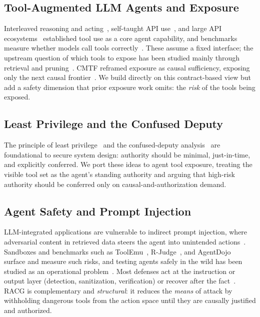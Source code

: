 \documentclass[conference,onecolumn]{IEEEtran}
\begin{document}
\subsection{Tool-Augmented LLM Agents and Exposure}
Interleaved reasoning and acting~\cite{yao2022react}, self-taught API use~\cite{schick2023toolformer}, and large API ecosystems~\cite{qin2023toollm} established tool use as a core agent capability, and benchmarks measure whether models call tools correctly~\cite{li2023apibank,patil2024bfcl,liu2023agentbench}. These assume a fixed interface; the upstream question of which tools to expose has been studied mainly through retrieval and pruning~\cite{shi2025toolret,gan2025ragmcp,liu2025toolscope,repantis2026howmanytools}. CMTF reframed exposure as causal sufficiency, exposing only the next causal frontier~\cite{anon2026cmtf}. We build directly on this contract-based view but add a safety dimension that prior exposure work omits: the \emph{risk} of the tools being exposed.

\subsection{Least Privilege and the Confused Deputy}
The principle of least privilege~\cite{saltzer1975protection} and the confused-deputy analysis~\cite{hardy1988confused} are foundational to secure system design: authority should be minimal, just-in-time, and explicitly conferred. We port these ideas to agent tool exposure, treating the visible tool set as the agent's standing authority and arguing that high-risk authority should be conferred only on causal-and-authorization demand.

\subsection{Agent Safety and Prompt Injection}
LLM-integrated applications are vulnerable to indirect prompt injection, where adversarial content in retrieved data steers the agent into unintended actions~\cite{greshake2023injection}. Sandboxes and benchmarks such as ToolEmu~\cite{ruan2024toolemu}, R-Judge~\cite{tian2023rjudge}, and AgentDojo~\cite{debenedetti2024agentdojo} surface and measure such risks, and testing agents safely in the wild has been studied as an operational problem~\cite{naihin2023testing}. Most defenses act at the instruction or output layer (detection, sanitization, verification) or recover after the fact~\cite{babu2026selfhealing}. RACG is complementary and \emph{structural}: it reduces the \emph{means} of attack by withholding dangerous tools from the action space until they are causally justified and authorized.
\end{document}
